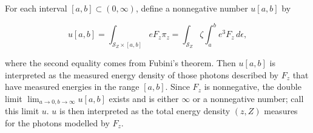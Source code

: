For each interval $[a, b] \subset (0, \infty)$, define a nonnegative number $u[a, b]$ by

$$u[a, b] = \int_{\mathcal{S}_Z \times [a, b]} eF_z \pi_z = \int_{\mathcal{S}_Z} \zeta \int_a^b e^3F_z \, d\epsilon,$$

where the second equality comes from Fubini's theorem. Then $u[a, b]$ is interpreted as the measured energy density of those photons described by $F_z$ that have measured energies in the range $[a, b]$. Since $F_z$ is nonnegative, the double limit $\lim_{a \to 0, b \to \infty} u[a, b]$ exists and is either $\infty$ or a nonnegative number; call this limit $u$. $u$ is then interpreted as the total energy density $(z, Z)$ measures for the photons modelled by $F_z$.
